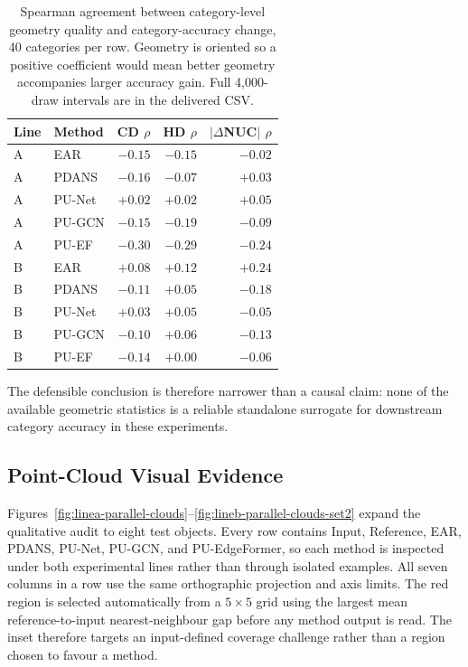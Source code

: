 \begin{table}[p]
\centering
\small
\begin{tabular}{llrrr}
\toprule
Line & Method & CD $\rho$ & HD $\rho$ & $|\Delta$NUC$|$ $\rho$ \\
\midrule
A & EAR & $-0.15$ & $-0.15$ & $-0.02$ \\
A & PDANS & $-0.16$ & $-0.07$ & $+0.03$ \\
A & PU-Net & $+0.02$ & $+0.02$ & $+0.05$ \\
A & PU-GCN & $-0.15$ & $-0.19$ & $-0.09$ \\
A & PU-EF & $-0.30$ & $-0.29$ & $-0.24$ \\
\midrule
B & EAR & $+0.08$ & $+0.12$ & $+0.24$ \\
B & PDANS & $-0.11$ & $+0.05$ & $-0.18$ \\
B & PU-Net & $+0.03$ & $+0.05$ & $-0.05$ \\
B & PU-GCN & $-0.10$ & $+0.06$ & $-0.13$ \\
B & PU-EF & $-0.14$ & $+0.00$ & $-0.06$ \\
\bottomrule
\end{tabular}
\caption{Spearman agreement between category-level geometry quality and category-accuracy change, 40 categories per row. Geometry is oriented so a positive coefficient would mean better geometry accompanies larger accuracy gain. Full 4,000-draw intervals are in the delivered CSV.}
\label{tab:category-alignment}
\end{table}

The defensible conclusion is therefore narrower than a causal claim: none of the available geometric statistics is a reliable standalone surrogate for downstream category accuracy in these experiments.

\subsection{Point-Cloud Visual Evidence}
\label{sec:qualitative}

Figures~\ref{fig:linea-parallel-clouds}--\ref{fig:lineb-parallel-clouds-set2} expand the qualitative audit to eight test objects. Every row contains Input, Reference, EAR, PDANS, PU-Net, PU-GCN, and PU-EdgeFormer, so each method is inspected under both experimental lines rather than through isolated examples. All seven columns in a row use the same orthographic projection and axis limits. The red region is selected automatically from a $5\times5$ grid using the largest mean reference-to-input nearest-neighbour gap before any method output is read. The inset therefore targets an input-defined coverage challenge rather than a region chosen to favour a method.

